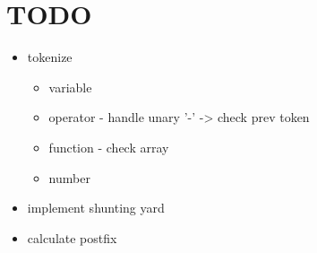 \documentclass[12pt]{article}
\begin{document}
	\section*{TODO}
	\begin{itemize}
		\item tokenize
			\begin{itemize}
				\item variable
				\item operator - handle unary '-' -> check prev token
				\item function - check array
				\item number
			\end{itemize}
		\item implement shunting yard
		\item calculate postfix
	\end{itemize}
\end{document}
